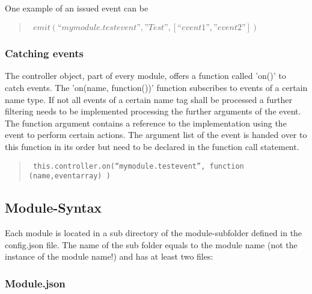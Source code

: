 One example of an issued event can be 

\begin{quote}
{\tt  
$emit(“mymodule.testevent”,”Test”,[“event1”,”event2”])$
}
\end{quote}

\subsubsection{Catching events}

The controller object, part of every module, offers a function called 'on()' to catch events. 
The 'on(name, function())' function subscribes to events of a certain name type. If not all  events of a certain name tag shall be processed a further filtering needs to be implemented  processing  the further arguments of the event. The function argument contains a reference 
to the implementation using the event to perform certain actions. The argument list of the event is 
handed over to this function in its order but need to be declared in the function call statement.

\begin{quote}
{\tt  
this.controller.on(“mymodule.testevent”, function (name,eventarray) {})
}
\end{quote}

\subsection{Module-Syntax}

Each module is located in a sub directory of the module-subfolder defined in the config.json file.
The name of the sub folder equals to the module name (not the instance of the module name!) and has at least two files:

\subsubsection{Module.json}

